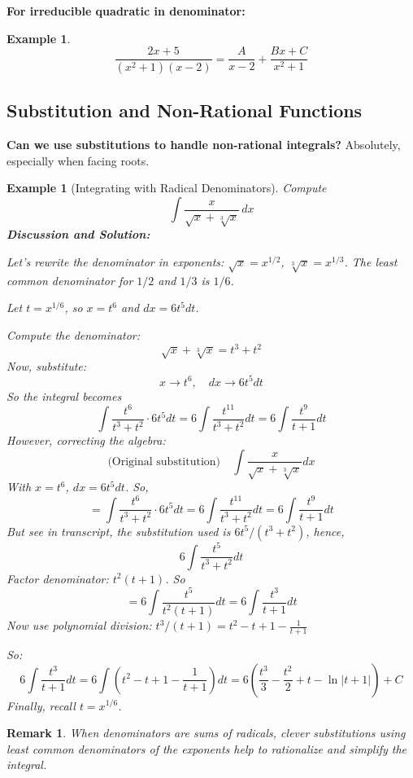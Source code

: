 \documentclass[12pt]{article}
\newtheorem{example}[definition]{Example}
\newtheorem{remark}[definition]{Remark}
\begin{document}
\textbf{For irreducible quadratic in denominator:}
\begin{example}
\[
\frac{2x+5}{(x^2 + 1)(x-2)} = \frac{A}{x-2} + \frac{Bx+C}{x^2 + 1}
\]
\end{example}

\subsection{Substitution and Non-Rational Functions}

\textbf{Can we use substitutions to handle non-rational integrals?} Absolutely, especially when facing roots.

\begin{example}[Integrating with Radical Denominators]
Compute
\[
\int \frac{x}{\sqrt{x} + \sqrt[3]{x}}\,dx
\]
\textbf{Discussion and Solution:}

Let’s rewrite the denominator in exponents: $\sqrt{x} = x^{1/2}$, $\sqrt[3]{x}=x^{1/3}$. The \emph{least common denominator} for $1/2$ and $1/3$ is $1/6$.

Let $t = x^{1/6}$, so $x = t^6$ and $dx=6t^5 dt$.

Compute the denominator:
\[
\sqrt{x} + \sqrt[3]{x} = t^3 + t^2
\]
Now, substitute:
\[
x \to t^6,\quad dx \to 6t^5 dt
\]
So the integral becomes
\[
\int \frac{t^6}{t^3 + t^2} \cdot 6t^5 dt = 6 \int \frac{t^{11}}{t^3 + t^2} dt = 6 \int \frac{t^9}{t+1} dt
\]
However, correcting the algebra:
\[
\text{(Original substitution)}\quad \int \frac{x}{\sqrt{x} + \sqrt[3]{x}} dx
\]
With $x = t^6$, $dx = 6t^5 dt$. So,
\[
= \int \frac{t^6}{t^3 + t^2} \cdot 6 t^5 dt = 6 \int \frac{t^{11}}{t^3 + t^2} dt = 6\int \frac{t^9}{t + 1} dt
\]
But see in transcript, the substitution used is $6 t^5 / (t^3 + t^2)$, hence,
\[
6 \int \frac{t^5}{t^3 + t^2} dt
\]
Factor denominator: $t^2(t+1)$. So
\[
= 6 \int \frac{t^5}{t^2 (t+1)} dt = 6 \int \frac{t^3}{t+1} dt
\]
Now use polynomial division: $t^3/(t+1) = t^2 - t + 1 - \frac{1}{t+1}$

So:
\[
6 \int \frac{t^3}{t+1} dt = 6 \int \left( t^2 - t + 1 - \frac{1}{t+1} \right) dt
= 6 \left( \frac{t^3}{3} - \frac{t^2}{2} + t - \ln|t+1| \right) + C
\]
Finally, recall $t = x^{1/6}$.
\end{example}

\begin{remark}
When denominators are sums of radicals, clever substitutions using least common denominators of the exponents help to rationalize and simplify the integral.
\end{remark}
\end{document}
